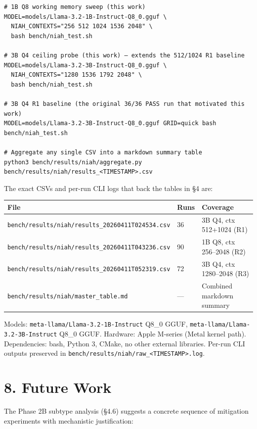 \documentclass[11pt]{article}
\begin{document}
\begin{lstlisting}
# 1B Q8 working memory sweep (this work)
MODEL=models/Llama-3.2-1B-Instruct-Q8_0.gguf \
  NIAH_CONTEXTS="256 512 1024 1536 2048" \
  bash bench/niah_test.sh

# 3B Q4 ceiling probe (this work) — extends the 512/1024 R1 baseline
MODEL=models/Llama-3.2-3B-Instruct-Q8_0.gguf \
  NIAH_CONTEXTS="1280 1536 1792 2048" \
  bash bench/niah_test.sh

# 3B Q4 R1 baseline (the original 36/36 PASS run that motivated this work)
MODEL=models/Llama-3.2-3B-Instruct-Q8_0.gguf GRID=quick bash bench/niah_test.sh

# Aggregate any single CSV into a markdown summary table
python3 bench/results/niah/aggregate.py bench/results/niah/results_<TIMESTAMP>.csv
\end{lstlisting}


The exact CSVs and per-run CLI logs that back the tables in §4 are:


\begin{center}
\begin{tabular}{lll}
\toprule
File & Runs & Coverage \\
\midrule
\texttt{bench/results/niah/results\_20260411T024534.csv} & 36 & 3B Q4, ctx 512+1024 (R1) \\
\texttt{bench/results/niah/results\_20260411T043236.csv} & 90 & 1B Q8, ctx 256–2048 (R2) \\
\texttt{bench/results/niah/results\_20260411T052319.csv} & 72 & 3B Q4, ctx 1280–2048 (R3) \\
\texttt{bench/results/niah/master\_table.md} & — & Combined markdown summary \\
\bottomrule
\end{tabular}
\end{center}


Models: \texttt{meta-llama/Llama-3.2-1B-Instruct} Q8\_0 GGUF, \texttt{meta-llama/Llama-3.2-3B-Instruct} Q8\_0 GGUF. Hardware: Apple M-series (Metal kernel path). Dependencies: bash, Python 3, CMake, no other external libraries. Per-run CLI outputs preserved in \texttt{bench/results/niah/raw\_<TIMESTAMP>.log}.


\section*{8. Future Work}


The Phase 2B subtype analysis (§4.6) suggests a concrete sequence of mitigation experiments with mechanistic justification:
\end{document}
